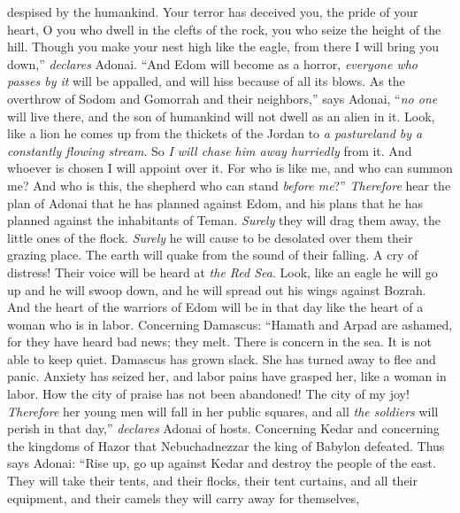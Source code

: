 \begin{biblechapter}
despised by the humankind.
\verse Your terror has deceived you, 
the pride of your heart, 
O you who dwell in the clefts of the rock, 
you who seize the height of the hill. 
Though you make your nest high like the eagle, 
from there I will bring you down,” \textit{declares} Adonai.
\verse “And Edom will become as a horror, 
\textit{everyone who passes by it} will be appalled, 
and will hiss because of all its blows.
\verse As the overthrow of Sodom and Gomorrah 
and their neighbors,” says Adonai, 
“\textit{no one} will live there, 
and the son of humankind will not dwell as an alien in it.
\verse Look, like a lion he comes up from the thickets of the Jordan 
to \textit{a pastureland by a constantly flowing stream}. 
So \textit{I will chase him away hurriedly} from it. 
And whoever is chosen I will appoint over it. 
For who is like me, and who can summon me? 
And who is this, the shepherd who can stand \textit{before me}?”
\verse \textit{Therefore} hear the plan of Adonai that he has planned against Edom, 
and his plans that he has planned against the inhabitants of Teman. 
\textit{Surely} they will drag them away, 
the little ones of the flock. 
\textit{Surely} he will cause to be desolated over them 
their grazing place.
\verse The earth will quake from the sound of their falling. 
A cry of distress! Their voice will be heard at \textit{the Red Sea}.
\verse Look, like an eagle he will go up and he will swoop down, 
and he will spread out his wings against Bozrah. 
And the heart of the warriors of Edom will be in that day 
like the heart of a woman who is in labor.
 Concerning Damascus:
\verse “Hamath and Arpad are ashamed, 
for they have heard bad news; 
they melt. 
There is concern in the sea. 
It is not able to keep quiet.
\verse Damascus has grown slack. 
She has turned away to flee and panic. 
Anxiety has seized her, 
and labor pains have grasped her, 
like a woman in labor.
\verse How the city of praise has not been abandoned! 
The city of my joy!
\verse \textit{Therefore} her young men will fall in her public squares, 
and all \textit{the soldiers} will perish in that day,” \textit{declares} Adonai of hosts.
 Concerning Kedar and concerning the kingdoms of Hazor that Nebuchadnezzar the king of Babylon defeated. Thus says Adonai:
\verse “Rise up, go up against Kedar 
and destroy the people of the east.
\verse They will take their tents, and their flocks, 
their tent curtains, and all their equipment, 
and their camels they will carry away for themselves, 

\end{biblechapter}
